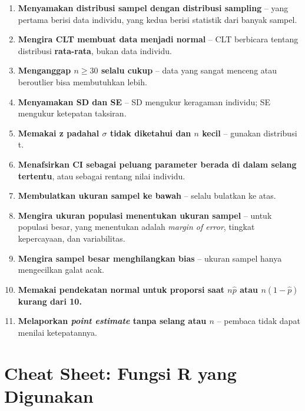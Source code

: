 \documentclass[
  indonesian,
  letterpaper,
]{book}
\begin{document}
\begin{enumerate}
\def\labelenumi{\arabic{enumi}.}
\item
  \textbf{Menyamakan distribusi sampel dengan distribusi sampling} --
  yang pertama berisi data individu, yang kedua berisi statistik dari
  banyak sampel.
\item
  \textbf{Mengira CLT membuat data menjadi normal} -- CLT berbicara
  tentang distribusi \textbf{rata-rata}, bukan data individu.
\item
  \textbf{Menganggap \(n \ge 30\) selalu cukup} -- data yang sangat
  menceng atau beroutlier bisa membutuhkan lebih.
\item
  \textbf{Menyamakan SD dan SE} -- SD mengukur keragaman individu; SE
  mengukur ketepatan taksiran.
\item
  \textbf{Memakai z padahal \(\sigma\) tidak diketahui dan \(n\) kecil}
  -- gunakan distribusi t.
\item
  \textbf{Menafsirkan CI sebagai peluang parameter berada di dalam
  selang tertentu}, atau sebagai rentang nilai individu.
\item
  \textbf{Membulatkan ukuran sampel ke bawah} -- selalu bulatkan ke
  atas.
\item
  \textbf{Mengira ukuran populasi menentukan ukuran sampel} -- untuk
  populasi besar, yang menentukan adalah \emph{margin of error}, tingkat
  kepercayaan, dan variabilitas.
\item
  \textbf{Mengira sampel besar menghilangkan bias} -- ukuran sampel
  hanya mengecilkan galat acak.
\item
  \textbf{Memakai pendekatan normal untuk proporsi saat \(n\hat{p}\)
  atau \(n(1 - \hat{p})\) kurang dari 10.}
\item
  \textbf{Melaporkan \emph{point estimate} tanpa selang atau \(n\)} --
  pembaca tidak dapat menilai ketepatannya.
\end{enumerate}

\section{Cheat Sheet: Fungsi R yang
Digunakan}\label{cheat-sheet-fungsi-r-yang-digunakan}
\end{document}
